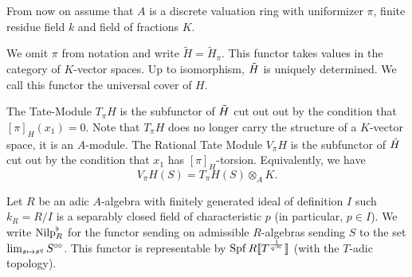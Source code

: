 \documentclass[../main.tex]{subfiles}
\begin{document}
From now on assume that $A$ is a discrete valuation ring with uniformizer
$\pi$, finite residue field $k$ and field of fractions $K$. 

\begin{defi}
  We omit $\pi$ from notation and write $\tilde H = \tilde H_\pi$. This functor
  takes values in the category of $K$-vector spaces.
  Up to isomorphism, $\Tilde H$ is uniquely determined. We call this functor
  the universal cover of $H$. 

  The Tate-Module $T_\pi H$ is the subfunctor of $\Tilde H$ cut out out
  by the condition that $[\pi]_H(x_1) = 0$. Note that $T_\pi H$ does no longer 
  carry the structure of a $K$-vector space, it is an $A$-module. The Rational
  Tate Module $V_\pi H$ is the subfunctor of $\Tilde H$ cut out by the
  condition that $x_1$ has $[\pi]_H$-torsion. Equivalently, we have 
  \begin{equation*}
    V_\pi H (S) = T_\pi H(S) \otimes_A K.
  \end{equation*}
\end{defi}

Let $R$ be an adic $A$-algebra with finitely generated ideal of definition $I$ such
$k_R = R/I$ is a separably closed field of characteristic $p$ (in particular, $p \in I$). 
We write ${\mathrm{Nilp}}^\flat_R$ for the functor sending on admissible $R$-algebras sending
$S$ to the set $\lim_{s \mapsto s^q} S^{\circ \hspace{-0.5pt} \circ}$. This functor is representable by
$\operatorname{Spf} R\llbracket T^{\frac 1{q^\infty}} \rrbracket$ (with the $T$-adic topology).
\end{document}
